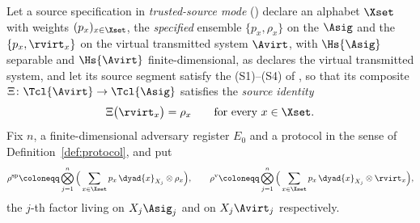 \begin{lemma}\label{lem:source-transfer}
Let a source specification in \emph{trusted-source mode}
() declare an alphabet $\Xset$ with weights
$(p_x)_{x\in\Xset}$, the \emph{specified} ensemble $\{p_x,\rho_x\}$ on the
 $\Asig$ and the 
$\{p_x,\rvirt_x\}$ on the virtual transmitted system $\Avirt$, with
$\Hs{\Asig}$ separable and $\Hs{\Avirt}$ finite-dimensional, as
 declares the virtual transmitted system,
and let its source segment satisfy
the  (S1)--(S4) of
, so that its composite
$\Xi\colon\Tcl{\Avirt}\to\Tcl{\Asig}$ satisfies the \emph{source identity}
\begin{equation}\label{eq:sourceidentity}
  \Xi\big(\rvirt_x\big)=\rho_x\qquad\text{for every }x\in\Xset .
\end{equation}
Fix $n$, a finite-dimensional adversary register $E_0$ and a protocol in the
sense of Definition~\ref{def:protocol}, and put
\begin{equation}\label{eq:prepstates}
  \rho^{\mathrm{sp}}\coloneqq\bigotimes_{j=1}^{n}
    \Big(\sum_{x\in\Xset}p_x\,\dyad{x}_{X_j}\otimes\rho_x\Big),
  \qquad
  \rho^{\mathrm{v}}\coloneqq\bigotimes_{j=1}^{n}
    \Big(\sum_{x\in\Xset}p_x\,\dyad{x}_{X_j}\otimes\rvirt_x\Big),
\end{equation}
the $j$-th factor living on $X_j\Asig_j$ and on $X_j\Avirt_j$ respectively.


\end{lemma}
